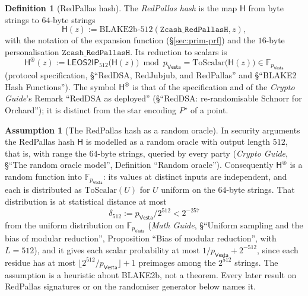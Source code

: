 \documentclass[11pt,a4paper]{article}
\theoremstyle{definition}
\newtheorem{definition}[theorem]{Definition}
\newtheorem{assumption}[theorem]{Assumption}
\newcommand{\F}{\mathbb{F}}
\newcommand{\Vesta}{\ensuremath{\mathsf{Vesta}}}
\begin{document}
\begin{definition}[RedPallas hash]
The \emph{RedPallas hash} is the map $\mathsf{H}$ from byte strings to
$64$-byte strings
\[
  \mathsf{H}(z) := \mathrm{BLAKE2b\text{-}512}(\texttt{Zcash\_RedPallasH},
    z),
\]
with the notation of the expansion function (\S\ref{sec:prim-prf}) and the
$16$-byte personalisation $\texttt{Zcash\_RedPallasH}$. Its reduction to
scalars is
\[
  \mathsf{H}^{\circledast}(z) := \mathsf{LEOS2IP}_{512}\bigl(\mathsf{H}(z)\bigr)
    \bmod p_{\Vesta} = \mathrm{ToScalar}\bigl(\mathsf{H}(z)\bigr)
    \in \F_{p_{\Vesta}}
\]
(protocol specification, \S``RedDSA, RedJubjub, and RedPallas'' and
\S``BLAKE2 Hash Functions''). The symbol $\mathsf{H}^{\circledast}$ is that of
the specification and of the \emph{Crypto Guide}'s Remark ``RedDSA as
deployed'' (\S``RedDSA: re-randomisable Schnorr for Orchard''); it is
distinct from the star encoding $P^{\star}$ of a point.
\end{definition}

\begin{assumption}[The RedPallas hash as a random oracle]\label{ass:hstar-ro}
In security arguments the RedPallas hash $\mathsf{H}$ is modelled as a random
oracle with output length $512$, that is, with range the $64$-byte strings,
queried by every party (\emph{Crypto Guide}, \S``The random oracle model'',
Definition ``Random oracle''). Consequently $\mathsf{H}^{\circledast}$ is a
random function into $\F_{p_{\Vesta}}$: its values at distinct inputs are
independent, and each is distributed as $\mathrm{ToScalar}(U)$ for $U$
uniform on the $64$-byte strings. That distribution is at statistical
distance at most
\[
  \delta_{512} := p_{\Vesta} / 2^{512} < 2^{-257}
\]
from the uniform distribution on $\F_{p_{\Vesta}}$ (\emph{Math Guide},
\S``Uniform sampling and the bias of modular reduction'', Proposition ``Bias
of modular reduction'', with $L = 512$), and it gives each scalar probability
at most $1/p_{\Vesta} + 2^{-512}$, since each residue has at most
$\lfloor 2^{512}/p_{\Vesta} \rfloor + 1$ preimages among the $2^{512}$
strings. The assumption is a heuristic about BLAKE2b, not a theorem. Every
later result on RedPallas signatures or on the randomiser generator below
names it.
\end{assumption}
\end{document}
